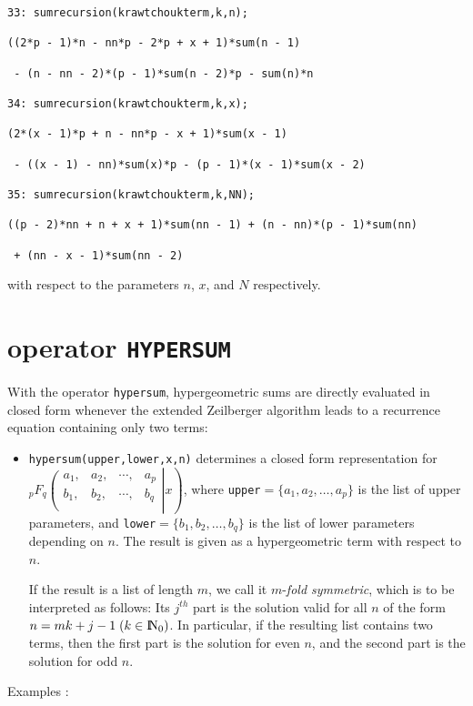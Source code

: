 {\small
\begin{verbatim}
33: sumrecursion(krawtchoukterm,k,n);

((2*p - 1)*n - nn*p - 2*p + x + 1)*sum(n - 1)

 - (n - nn - 2)*(p - 1)*sum(n - 2)*p - sum(n)*n

34: sumrecursion(krawtchoukterm,k,x);

(2*(x - 1)*p + n - nn*p - x + 1)*sum(x - 1)

 - ((x - 1) - nn)*sum(x)*p - (p - 1)*(x - 1)*sum(x - 2)

35: sumrecursion(krawtchoukterm,k,NN);

((p - 2)*nn + n + x + 1)*sum(nn - 1) + (n - nn)*(p - 1)*sum(nn)

 + (nn - x - 1)*sum(nn - 2)
\end{verbatim}
}\noindent
with respect to the parameters $n$, $x$, and $N$ respectively.

\section{\REDUCE{} operator {\tt HYPERSUM}}

With the operator {\tt hypersum}, hypergeometric sums are directly
evaluated in closed form whenever the extended
Zeilberger algorithm leads to a recurrence equation containing only
two terms:
\begin{itemize}
\item
{\tt hypersum(upper,lower,x,n)} determines a closed form representation
for
$_{p}F_{q}\left.\left(\begin{array}{cccc}
a_{1},&a_{2},&\cdots,&a_{p}\\
b_{1},&b_{2},&\cdots,&b_{q}\\
            \end{array}\right| x\right)
$, where {\tt upper}$=\{a_{1}, a_{2}, \ldots, a_{p}\}$
is the list of upper parameters, and
{\tt lower}$=\{b_{1}, b_{2}, \ldots, b_{q}\}$
is the list of lower parameters depending on $n$. The result is given as a
hypergeometric term with respect to $n$.

If the result is a list of length $m$, we call it $m$-{\sl fold symmetric},
which is to be interpreted as follows:
Its $j^{th}$ part is the solution valid for all $n$ of the form $n=mk+j-1
\;(k\in\N_0)$.
In particular, if the resulting list contains two terms, then
the first part is the solution for even $n$, and the second part is the
solution for odd $n$.
\end{itemize}
Examples \cite{Koepf}:

